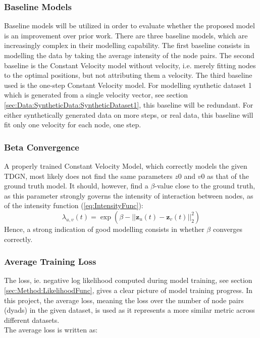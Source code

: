 \subsubsection{Baseline Models}
\label{sec:Method:Evaluation:BaselineModels}
Baseline models will be utilized in order to evaluate whether the proposed model is an improvement over prior work.
There are three baseline models, which are increasingly complex in their modelling capability.
The first baseline consists in modelling the data by taking the average intensity of the node pairs.
The second baseline is the Constant Velocity model without velocity, i.e. merely fitting nodes to the optimal positions, but not attributing them a velocity.
The third baseline used is the one-step Constant Velocity model.
For modelling synthetic dataset 1 which is generated from a single velocity vector, see section \ref{sec:Data:SyntheticData:SyntheticDataset1}, this baseline will be redundant.
For either synthetically generated data on more steps, or real data, this baseline will fit only one velocity for each node, one step.


\subsubsection{Beta Convergence}
\label{sec:Method:Evaluation:BetaConvergence}
A properly trained Constant Velocity Model, which correctly models the given TDGN, most likely does not find the same parameters $z0$ and $v0$ as that of the ground truth model.
It should, however, find a $\beta$-value close to the ground truth, as this parameter strongly governs the intensity of interaction between nodes, as of the intensity function (\ref{eq:IntensityFunc}):
\begin{equation*}
    \lambda_{u,v}(t)
    =
    \exp \left(\beta - ||\textbf{z}_u(t) - \textbf{z}_v(t)||_2^2\right)
\end{equation*}
Hence, a strong indication of good modelling consists in whether $\beta$ converges correctly.


\subsubsection{Average Training Loss}
\label{sec:Method:Evaluation:Loss}
The loss, ie. negative log likelihood computed during model training, see section \ref{sec:Method:LikelihoodFunc}, gives a clear picture of model training progress.
In this project, the average loss, meaning the loss over the number of node pairs (dyads) in the given dataset, is used as it represents a more similar metric across different datasets.
\\
The average loss is written as:


